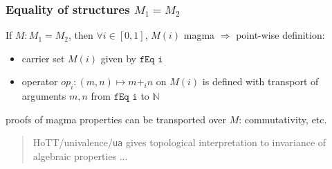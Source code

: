 \documentclass[english]{beamer}
\begin{document}
\begin{frame}[fragile]
\frametitle{Equality of structures $M_1=M_2$}

If $M : M_1 = M_2$, then $\forall i \in [0, 1]$, $M (i)$ magma $\Rightarrow$ point-wise definition:

\begin{itemize}
 \item carrier set $M(i)$ given by $\texttt{fEq i}$
 \item operator $op_i: (m,n) \mapsto m +_i n$ on $M(i)$ is defined with transport of arguments $m,n$ from $\texttt{fEq i}$ to $\mathbb{N}$
\end{itemize}


proofs of magma properties can be transported over $M$: commutativity, etc.




\begin{quotation}
HoTT/univalence/\texttt{ua} gives topological interpretation to invariance of algebraic properties ...
\end{quotation}


\end{frame}
\end{document}
